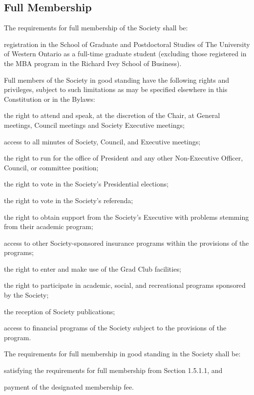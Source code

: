 \subsection{Full Membership}
	\begin{longenum}[label*=\thesubsection.\arabic*., align=left]
 \item The requirements for full membership of the Society shall be: 
     	\begin{longenum}[label*=\arabic*., align=left]
    	\item registration in the School of Graduate and Postdoctoral Studies of The University of Western Ontario as a full-time graduate student (excluding those registered in the MBA program in the Richard Ivey School of Business).
   	\end{longenum}
 \item  Full members of the Society in good standing have the following rights and privileges, subject to such limitations as may be specified elsewhere in this Constitution or in the Bylaws:
\begin{longenum}[label*=\arabic*., align=left]
  \item the right to attend and speak, at the discretion of the Chair, at General meetings, Council meetings and Society Executive meetings;
  \item access to all minutes of Society, Council, and Executive meetings;
  \item the right to run for the office of President and any other Non-Executive Officer, Council, or committee position;
  \item the right to vote in the Society's Presidential elections;
  \item the right to vote in the Society's referenda; 
  \item the right to obtain support from the Society's Executive with problems stemming from their academic program; 
  \item access to other Society-sponsored insurance programs within the provisions of the programs; 
  \item the right to enter and make use of the Grad Club facilities;
  \item the right to participate in academic, social, and recreational programs sponsored by the Society; 
  \item the reception of Society publications;
   \item access to financial programs of the Society subject to the provisions of the program.
	\end{longenum}
  \item The requirements for full membership in good standing in the Society shall be: 
  	\begin{longenum}[label*=\arabic*., align=left]
  	\item satisfying the requirements for full membership from Section 1.5.1.1, and 
    \item payment of the designated membership fee.  
  	\end{longenum}
 
\end{longenum}


